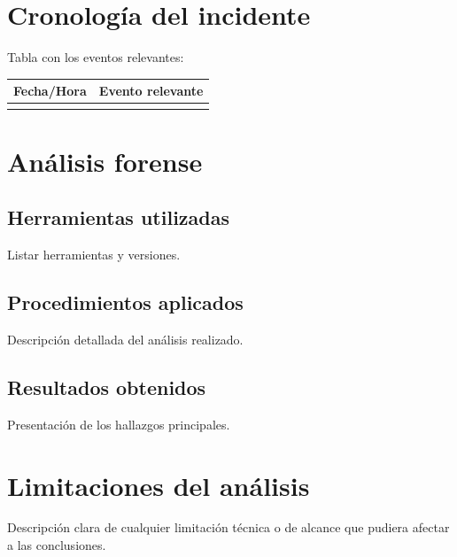 \documentclass[12pt,a4paper]{article}
\begin{document}
\section{Cronología del incidente}
Tabla con los eventos relevantes:

\begin{table}[H]
\centering
\begin{tabular}{|c|p{10cm}|}
\hline
Fecha/Hora & Evento relevante \\ \hline
 &  \\ \hline
\end{tabular}
\end{table}

\newpage

\section{Análisis forense}

\subsection{Herramientas utilizadas}
Listar herramientas y versiones.

\subsection{Procedimientos aplicados}
Descripción detallada del análisis realizado.

\subsection{Resultados obtenidos}
Presentación de los hallazgos principales.

\newpage

\section{Limitaciones del análisis}
Descripción clara de cualquier limitación técnica o de alcance que pudiera afectar a las conclusiones.

\newpage

\end{document}
